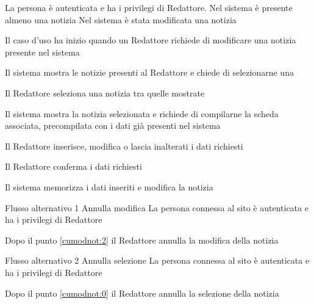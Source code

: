\tabcuvspace

{}
{La persona è autenticata e ha i privilegi di Redattore. Nel sistema è presente almeno una notizia}
{Nel sistema è stata modificata una notizia}
{\begin{enumCU}
	\item Il caso d'uso ha inizio quando un Redattore richiede di modificare una notizia presente nel sistema
	\item Il sistema mostra le notizie presenti al Redattore e chiede di selezionarne una \label{cumodnot:0}
	\item Il Redattore seleziona una notizia tra quelle mostrate
	\item Il sistema mostra la notizia selezionata e richiede di compilarne la scheda associata, precompilata con i dati già presenti nel sistema 
	\item Il Redattore inserisce, modifica o lascia inalterati i dati richiesti \label{cumodnot:2}
	\item Il Redattore conferma i dati richiesti
	\item Il sistema memorizza i dati inseriti e modifica la notizia
\end{enumCU}}
%
{Flusso alternativo 1}%
{Annulla modifica}%
{La persona connessa al sito è autenticata e ha i privilegi di Redattore}%
{\postNulle}%
{\begin{enumCU}
		\item Dopo il punto \ref{cumodnot:2} il Redattore annulla la modifica della notizia
\end{enumCU}}%
%
{Flusso alternativo 2}%
{Annulla selezione}%
{La persona connessa al sito è autenticata e ha i privilegi di Redattore}%
{\postNulle}%
{\begin{enumCU}
		\item Dopo il punto \ref{cumodnot:0} il Redattore annulla la selezione della notizia
\end{enumCU}}%

\tabcuvspace

